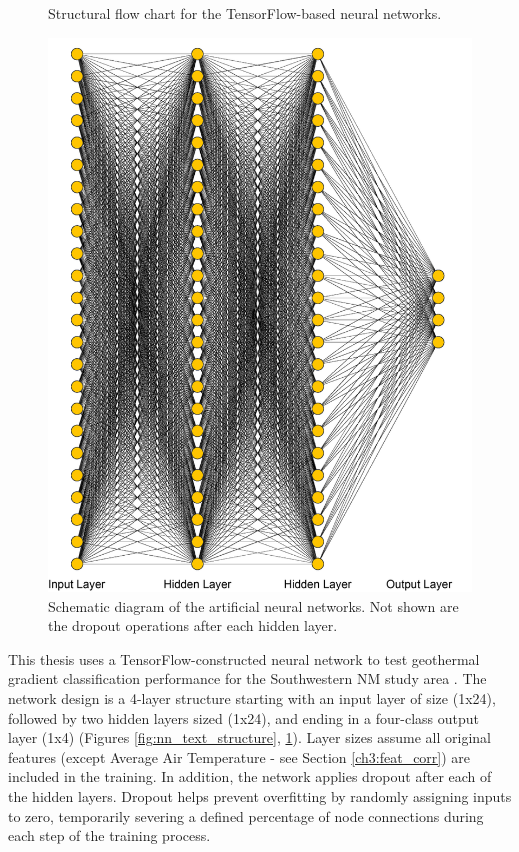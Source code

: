 \begin{figure}[!htp]
\begin{minipage}[b][][b]{.35\linewidth}
    \caption[Neural network structural flow]{Structural flow chart for the TensorFlow-based neural networks.}
    \label{fig:nn_text_structure}
\end{minipage}
\hfill
\begin{minipage}[b][][b]{.61\linewidth}
    \includegraphics[width=\linewidth]{templates/images/Figure-ANN.png}
    \caption[Neural network structural schematic]{Schematic diagram of the artificial neural networks. Not shown are the dropout operations after each hidden layer.}
    \label{fig:nn_dot_structure}
\end{minipage}
\end{figure}
This thesis uses a TensorFlow-constructed neural network to test geothermal gradient classification performance for the Southwestern NM study area \citep{abadi_tensorflow_2016}. The network design is a 4-layer structure starting with an input layer of size (1x24), followed by two hidden layers sized (1x24), and ending in a four-class output layer (1x4) (Figures \ref{fig:nn_text_structure}, \ref{fig:nn_dot_structure}). Layer sizes assume all original features (except Average Air Temperature - see Section \ref{ch3:feat_corr}) are included in the training. In addition, the network applies dropout after each of the hidden layers. Dropout helps prevent overfitting by randomly assigning inputs to zero, temporarily severing a defined percentage of node connections during each step of the training process.


